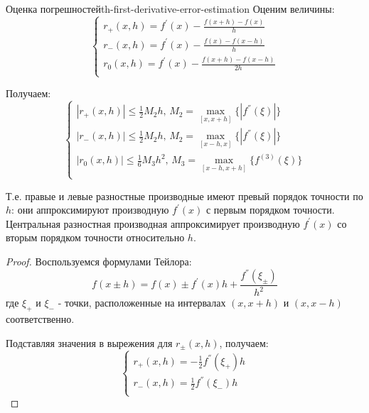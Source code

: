 \documentclass[14pt]{extarticle}
\begin{document}
    \begin{theorem}{Оценка погрешностей}{th-first-derivative-error-estimation}
        Оценим величины:
        $$
        \begin{cases}
            r_{+}(x, h) = f^{'}(x) - \frac{f(x + h) - f(x)}{h}\\
            r_{-}(x, h) = f^{'}(x) - \frac{f(x) - f(x - h)}{h}\\
            r_{0}(x, h) = f^{'}(x) - \frac{f(x + h) - f(x - h)}{2h}\\
        \end{cases}
        $$

        Получаем:
        $$
        \begin{cases}
            |r_{+}(x, h)| \leq \frac{1}{2}M_{2}h \text{, } M_{2} = \max_{[x, x+h]}\{|f^{''}(\xi)|\} \\
            |r_{-}(x, h)| \leq \frac{1}{2}M_{2}h \text{, } M_{2} = \max_{[x-h, x]}\{|f^{''}(\xi)|\}\\
            |r_{0}(x, h)| \leq \frac{1}{6}M_{3}h^{2} \text{, } M_{3} = \max_{[x-h, x+h]}\{f^{(3)}(\xi)\}\\
        \end{cases}
        $$

        Т.е. правые и левые разностные производные имеют превый порядок точности по $h$: они аппроксимируют производную $f^{'}(x)$ с первым порядком точности.\\
        Центральная разностная производная аппроксимирует производную $f^{'}(x)$ со вторым порядком точности относительно $h$.

        \begin{proof}
            Воспользуемся формулами Тейлора:
            $$f(x \pm h) = f(x) \pm f^{'}(x)h + \frac{f^{''}(\xi_{\pm})}{h^{2}}$$
            где $\xi_{+}$ и $\xi_{-}$ - точки, расположенные на интервалах $(x, x+h)$ и $(x, x-h)$ соответственно.
            
            \vspace{\baselineskip}

            Подставляя значения в вырежения для $r_{\pm}(x, h)$, получаем:
            $$
            \begin{cases}
                r_{+}(x, h) = -\frac{1}{2}f^{''}(\xi_{+})h\\
                r_{-}(x, h) = \frac{1}{2}f^{''}(\xi_{-})h\\
            \end{cases}
            $$


\end{proof}
\end{theorem}
\end{document}
